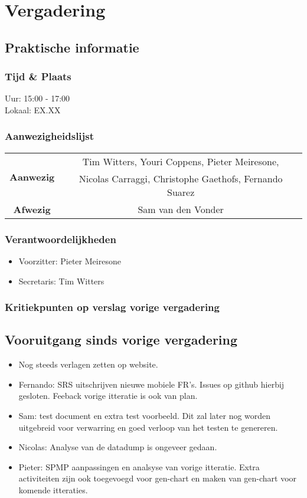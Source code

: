 \section{Vergadering \MeetingDate}
\subsection{Praktische informatie}
\subsubsection{Tijd \& Plaats}
Uur: 15:00 - 17:00
\\
Lokaal: EX.XX
\subsubsection{Aanwezigheidslijst}
\begin{table}[htbp]
	\centering
	\begin{tabular}{c|c}
		\multirow{2}{*}{\textbf{Aanwezig}} & Tim Witters, Youri Coppens, Pieter Meiresone, \\
		& Nicolas Carraggi,  Christophe Gaethofs, Fernando Suarez\\
		\hline
		\textbf{Afwezig} & Sam van den Vonder \\
	\end{tabular}
\end{table}

\subsubsection{Verantwoordelijkheden}
\begin{itemize}
	\item Voorzitter: Pieter Meiresone
	\item Secretaris: Tim Witters
\end{itemize}

\subsubsection{Kritiekpunten op verslag vorige vergadering}

\subsection{Vooruitgang sinds vorige vergadering}
	\begin{itemize}
		\item Nog steeds verlagen zetten op website.
		\item Fernando: SRS uitschrijven nieuwe mobiele FR's. Issues op github hierbij gesloten. Feeback vorige itteratie is ook van plan. 
		\item Sam: test document en extra test voorbeeld. Dit zal later nog worden uitgebreid voor verwarring en goed verloop van het testen te genereren.
		\item Nicolas: Analyse van  de datadump is ongeveer gedaan.
		\item Pieter: SPMP aanpassingen en analsyse van vorige itteratie. Extra activiteiten zijn ook toegevoegd voor gen-chart en maken van gen-chart voor komende itteraties. 
	\end{itemize}
	
